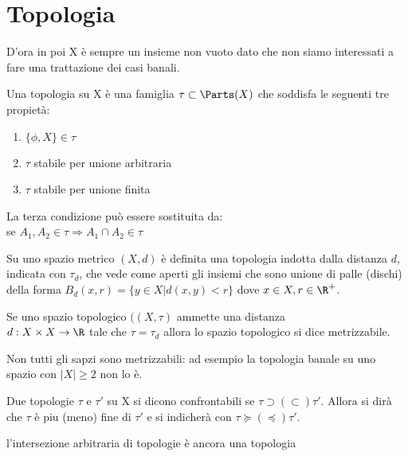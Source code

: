 \documentclass[a4paper]{article}
\begin{document}
\section{Topologia}
D'ora in poi X è sempre un insieme non vuoto dato che non siamo interessati a fare una trattazione dei casi banali.
\begin{deff} 
Una topologia su X è una famiglia $\tau \subset \Parts ( X) $ che soddisfa le seguenti tre propietà: 
\begin{enumerate} 
\item $\{ \phi , X \} \in \tau $ 
\item $\tau $ stabile per unione arbitraria 
\item $\tau $ stabile per unione finita
\end{enumerate}
\end{deff}
\begin{oss} La terza condizione può essere sostituita da: \\
se $ A_1 , A_2 \in \tau \Rightarrow A_1 \cap A_2 \in \tau $
\end{oss}

\begin{deff}
Su uno spazio metrico $(X,d ) $ è definita una topologia indotta dalla distanza $d$, indicata con $\tau _d $, che vede come aperti gli insiemi che sono unione di palle (dischi) della forma $B_d (x,r) =\{ y \in X | d(x,y) < r \} $ dove $ x \in X, r \in \R ^+ $. 
\end{deff}

\begin{deff}
Se uno spazio topologico $((X,\tau ) $ ammette una distanza \\ $ d : X \times X \to \R $ tale che $\tau = \tau _d $ allora lo spazio topologico si dice metrizzabile. 
\end{deff}
\begin{oss} Non tutti gli sapzi sono metrizzabili: ad esempio la topologia banale su uno spazio con $|X| \geq 2 $ non lo è.
\end{oss} 

\begin{deff}
Due topologie $ \tau $ e $ \tau '  $ su X si dicono confrontabili se $  \tau \supset ( \subset)  \tau '  $. Allora si dirà che $\tau $ è piu (meno) fine di $ \tau ' $ e si indicherà con $\tau \succeq (\preceq ) \tau ' $.
\end{deff}

\begin{oss}
l'intersezione arbitraria di topologie è ancora una topologia
\end{oss}
\end{document}
